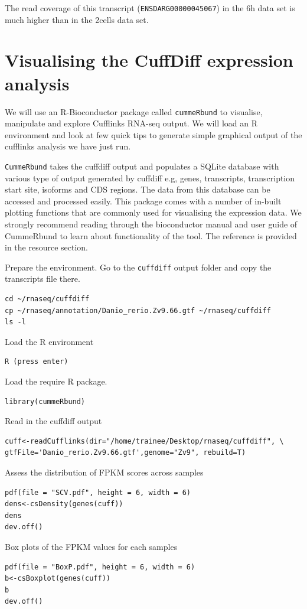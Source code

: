 \begin{bonus}
\begin{questions}
\begin{answer}
The read coverage of this transcript (\texttt{ENSDARG00000045067}) in the 6h
data set is much higher than in the 2cells data set.
\end{answer}
\end{questions}


\section{Visualising the CuffDiff expression analysis}
We will use an R-Bioconductor package called \texttt{cummeRbund} to visualise, manipulate and explore Cufflinks RNA-seq output. We will load an R environment and look at few quick tips to generate simple graphical output of the cufflinks analysis we have just run.

\begin{information}
\texttt{CummeRbund} takes the cuffdiff output and populates a SQLite database with various type of output generated by cuffdiff e.g, genes, transcripts, transcription start site, isoforms and CDS regions. The data from this database can be accessed and processed easily. This package comes with a number of in-built plotting functions that are commonly used for visualising the expression data. We strongly recommend reading through the bioconductor manual and user guide of CummeRbund to learn about functionality of the tool. The reference is provided in the resource section.
\end{information}

\begin{steps}
Prepare the environment. Go to the \texttt{cuffdiff} output folder and copy the transcripts file there.
\begin{lstlisting}
cd ~/rnaseq/cuffdiff
cp ~/rnaseq/annotation/Danio_rerio.Zv9.66.gtf ~/rnaseq/cuffdiff
ls -l
\end{lstlisting}

Load the R environment
\begin{lstlisting}
R (press enter)
\end{lstlisting}
Load the require R package.
\begin{lstlisting}
library(cummeRbund)
\end{lstlisting}
Read in the cuffdiff output
\begin{lstlisting}
cuff<-readCufflinks(dir="/home/trainee/Desktop/rnaseq/cuffdiff", \
gtfFile='Danio_rerio.Zv9.66.gtf',genome="Zv9", rebuild=T)
\end{lstlisting}
Assess the distribution of FPKM scores across samples
\begin{lstlisting}
pdf(file = "SCV.pdf", height = 6, width = 6)
dens<-csDensity(genes(cuff))
dens
dev.off()
\end{lstlisting}
Box plots of the FPKM values for each samples
\begin{lstlisting}
pdf(file = "BoxP.pdf", height = 6, width = 6)
b<-csBoxplot(genes(cuff))
b
dev.off()
\end{lstlisting}




\end{steps}
\end{bonus}
